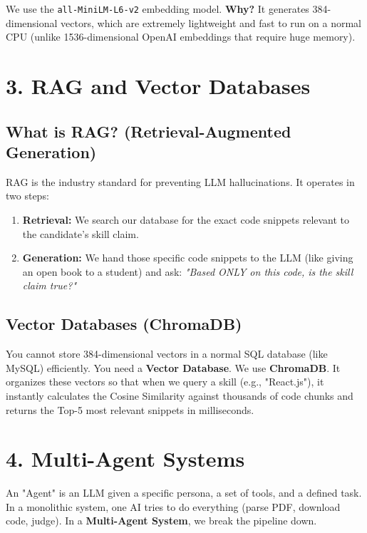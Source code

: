 \documentclass[12pt,a4paper]{article}
\begin{document}
\begin{tcolorbox}[colback=blue!5!white,colframe=blue!75!black,title=Our Tech Stack: all-MiniLM-L6-v2]
We use the \texttt{all-MiniLM-L6-v2} embedding model. 
\textbf{Why?} It generates 384-dimensional vectors, which are extremely lightweight and fast to run on a normal CPU (unlike 1536-dimensional OpenAI embeddings that require huge memory).
\end{tcolorbox}

\section{3. RAG and Vector Databases}
\subsection{What is RAG? (Retrieval-Augmented Generation)}
RAG is the industry standard for preventing LLM hallucinations. It operates in two steps:
\begin{enumerate}
    \item \textbf{Retrieval:} We search our database for the exact code snippets relevant to the candidate's skill claim.
    \item \textbf{Generation:} We hand those specific code snippets to the LLM (like giving an open book to a student) and ask: \textit{"Based ONLY on this code, is the skill claim true?"}
\end{enumerate}

\subsection{Vector Databases (ChromaDB)}
You cannot store 384-dimensional vectors in a normal SQL database (like MySQL) efficiently. You need a \textbf{Vector Database}.
We use \textbf{ChromaDB}. It organizes these vectors so that when we query a skill (e.g., "React.js"), it instantly calculates the Cosine Similarity against thousands of code chunks and returns the Top-5 most relevant snippets in milliseconds.

\section{4. Multi-Agent Systems}
An "Agent" is an LLM given a specific persona, a set of tools, and a defined task. In a monolithic system, one AI tries to do everything (parse PDF, download code, judge). In a \textbf{Multi-Agent System}, we break the pipeline down.
\end{document}
